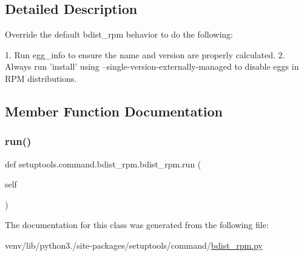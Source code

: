 \subsection{Detailed Description}
\begin{DoxyVerb}Override the default bdist_rpm behavior to do the following:

1. Run egg_info to ensure the name and version are properly calculated.
2. Always run 'install' using --single-version-externally-managed to
   disable eggs in RPM distributions.
\end{DoxyVerb}
 

\subsection{Member Function Documentation}
\mbox{\label{classsetuptools_1_1command_1_1bdist__rpm_1_1bdist__rpm_af4bf74a4d1fcf5869be29590fd1b4287}} 
\subsubsection{\texorpdfstring{run()}{run()}}
{\footnotesize\ttfamily def setuptools.\+command.\+bdist\+\_\+rpm.\+bdist\+\_\+rpm.\+run (\begin{DoxyParamCaption}\item[{}]{self }\end{DoxyParamCaption})}



The documentation for this class was generated from the following file\+:\begin{DoxyCompactItemize}
\item 
venv/lib/python3./site-\/packages/setuptools/command/\hyperlink{setuptools_2command_2bdist__rpm_8py}{bdist\+\_\+rpm.\+py}\end{DoxyCompactItemize}
